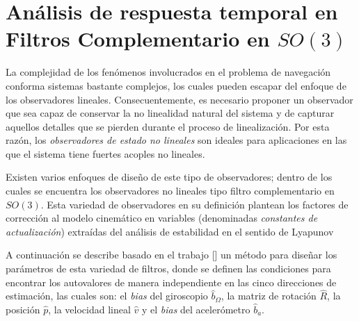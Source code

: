 \documentclass[10pt]{report}
\numberwithin{equation}{chapter}
\numberwithin{algorithm}{chapter}
\newcommand{\bcite}[1]{[\cite{#1}]}
\begin{document}
\section{Análisis de respuesta temporal en Filtros Complementario en $SO(3)$}\label{obs_acp1}
La complejidad de los fenómenos involucrados en el problema de navegación conforma sistemas bastante complejos, los cuales pueden escapar del enfoque de los observadores lineales. Consecuentemente, es necesario proponer un observador que sea capaz de conservar la no linealidad natural del sistema y de capturar aquellos detalles que se pierden durante el proceso de linealización. Por esta razón, los \emph{observadores de estado no lineales} son ideales para aplicaciones en las que el sistema tiene fuertes acoples no lineales.\par
Existen varios enfoques de diseño de este tipo de observadores; dentro de los cuales se encuentra los observadores no lineales tipo filtro complementario en $SO(3)$. Esta variedad de observadores en su definición plantean los factores de corrección al modelo cinemático en variables (denominadas \emph{constantes de actualización}) extraídas del análisis de estabilidad en el sentido de Lyapunov\par
A continuación se describe basado en el trabajo \bcite{Scandaro2011} un método para diseñar los parámetros de esta variedad de filtros, donde se definen las condiciones para encontrar los autovalores de manera independiente en las cinco direcciones de estimación, las cuales son: el \emph{bias} del giroscopio $\hat{b}_{\Omega}$, la matriz de rotación $\hat{R}$, la posición $\hat{p}$, la velocidad lineal $\hat{v}$ y el \emph{bias} del acelerómetro $\hat{b}_a$. 
\end{document}
